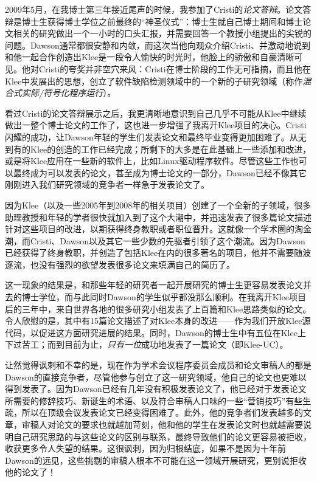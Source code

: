 \documentclass[letter,12pt]{book}
\begin{document}
\begin{CJK}{UTF8}{gbsn}
\breakline

2009年5月，在我博士第三年接近尾声的时候，我参加了Cristi的\emph{论文答辩}。论文答辩是博士生获得博士学位之前最终的“神圣仪式”：博士生就自己博士期间和博士论文相关的研究做出一个一小时的口头汇报，并需要回答一个教授小组提出的尖锐的问题。Dawson通常都很安静和内敛，而这次当他向观众介绍Cristi、并激动地说到和他一起合作创造出Klee是一段令人愉快的时光时，他脸上的骄傲和自豪清晰可见。他对Cristi的夸奖并非空穴来风：Cristi在博士阶段的工作无可指摘，而且他在Klee中发展出的思想，创立了软件缺陷检测领域中的一个新的子研究领域（称作\emph{混合式实际/符号化程序运行}）。

看过Cristi的论文答辩展示之后，我更清晰地意识到自己几乎不可能从Klee中继续做出一整个博士论文的工作了，这也进一步增强了我离开Klee项目的决心。Cristi闪耀的成功，让Dawson年轻的学生们发表论文和最终毕业变得更加困难了。从无到有的Klee的创造的工作已经完成；所剩下的大多是在此基础上一些添加和改进，或是将Klee应用在一些新的软件上，比如Linux驱动程序软件。尽管这些工作也可以最终成为可以发表的论文，甚至成为博士论文的一部分，Dawson已经不像其它刚刚进入我们研究领域的竞争者一样急于发表论文了。

因为Klee（以及一些2005年到2008年的相关项目）创建了一个全新的子领域，很多助理教授和年轻的学者很快就加入到了这个大潮中，并迅速发表了很多篇论文描述针对这些项目的改进，以期获得终身教职或者职位晋升。这就像一个学术圈的淘金潮，而Cristi、Dawson以及其它一些少数的先驱者引领了这个潮流。因为Dawson已经获得了终身教职，并创造了包括Klee在内的很多著名的项目，他并不需要随波逐流，也没有强烈的欲望发表很多论文来填满自己的简历了。

这一现象的结果是，和那些年轻的研究者一起开展研究的博士生更容易发表论文并去的博士学位，而与此同时Dawson的学生似乎都没那么顺利。在我离开Klee项目后的三年中，来自世界各地的很多研究小组发表了上百篇和Klee思路类似的论文。令人欣慰的是，其中有15篇论文描述了对Klee本身的改进——作为我们开放Klee源代码，以促进这方面研究进展的结果。同时，Dawson的博士生中有五位在Klee上下过苦工；而到目前为止，\emph{只有一位}成功地发表了一篇论文（即Klee-UC）。

让然觉得讽刺和不幸的是，现在作为学术会议程序委员会成员和论文审稿人的都是Dawson的直接竞争者，尽管他参与创立了这一研究领域，他自己的论文也更难以得到发表了。因为Dawson已经有几年没有积极发表论文了，他已经对于发表论文所需要的修辞技巧、新诞生的术语、以及符合审稿人口味的一些“营销技巧”有些生疏，所以在顶级会议发表论文已经变得困难了。此外，他的竞争者们发表越多的文章，审稿人对论文的要求也就越加苛刻，他和他的学生在发表论文时也就越需要说明自己研究思路的与这些论文的区别与联系，最终导致他们的论文更容易被拒收，收获更多令人失望的结果。这很讽刺，因为归根结底，如果不是因为十年前Dawson的远见，这些挑剔的审稿人根本不可能在这一领域开展研究，更别说拒收他的论文了！


\end{CJK}
\end{document}
